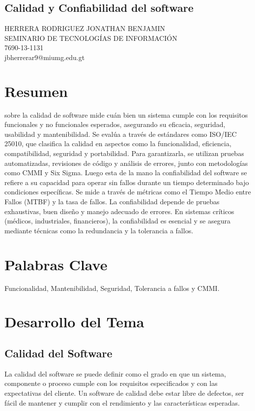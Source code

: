 \documentclass[12pt]{article}
\begin{document}
\begin{center}
\section*{Calidad y Confiabilidad del software}
HERRERA RODRIGUEZ JONATHAN BENJAMIN
\\SEMINARIO DE TECNOLOGÍAS DE INFORMACIÓN
\\7690-13-1131
\\jbherrerar9@miumg.edu.gt
\end{center}
\section{Resumen}

sobre la calidad de software mide cuán bien un sistema cumple con los requisitos funcionales y no funcionales esperados, asegurando su eficacia, seguridad, usabilidad y mantenibilidad. Se evalúa a través de estándares como ISO/IEC 25010, que clasifica la calidad en aspectos como la funcionalidad, eficiencia, compatibilidad, seguridad y portabilidad. Para garantizarla, se utilizan pruebas automatizadas, revisiones de código y análisis de errores, junto con metodologías como CMMI y Six Sigma.
Luego esta de la mano la confiabilidad del software se refiere a su capacidad para operar sin fallos durante un tiempo determinado bajo condiciones específicas. Se mide a través de métricas como el Tiempo Medio entre Fallos (MTBF) y la tasa de fallos. La confiabilidad depende de pruebas exhaustivas, buen diseño y manejo adecuado de errores. En sistemas críticos (médicos, industriales, financieros), la confiabilidad es esencial y se asegura mediante técnicas como la redundancia y la tolerancia a fallos.

\section{Palabras Clave}
Funcionalidad, Mantenibilidad, Seguridad, Tolerancia a fallos y CMMI.

\section{Desarrollo del Tema}

\subsection*{Calidad del Software}
La calidad del software se puede definir como el grado en que un sistema, componente o proceso cumple con los requisitos especificados y con las expectativas del cliente. Un software de calidad debe estar libre de defectos, ser fácil de mantener y cumplir con el rendimiento y las características esperadas.
\end{document}
